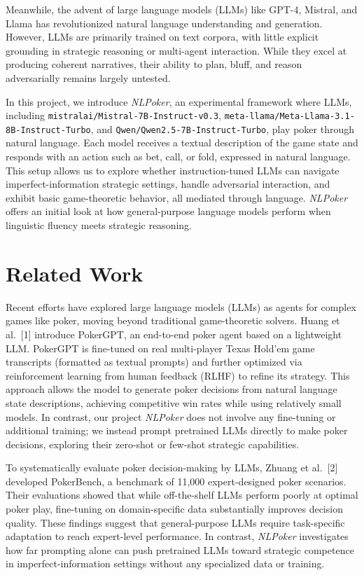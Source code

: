 \documentclass{article}
\begin{document}
Meanwhile, the advent of large language models (LLMs) like GPT-4, Mistral, and Llama has revolutionized natural language understanding and generation. However, LLMs are primarily trained on text corpora, with little explicit grounding in strategic reasoning or multi-agent interaction. While they excel at producing coherent narratives, their ability to plan, bluff, and reason adversarially remains largely untested.

In this project, we introduce \emph{NLPoker}, an experimental framework where LLMs, including \texttt{mistralai/Mistral-7B-Instruct-v0.3}, \texttt{meta-llama/Meta-Llama-3.1-8B-Instruct-Turbo}, and \texttt{Qwen/Qwen2.5-7B-Instruct-Turbo}, play poker through natural language. Each model receives a textual description of the game state and responds with an action such as bet, call, or fold, expressed in natural language. This setup allows us to explore whether instruction-tuned LLMs can navigate imperfect-information strategic settings, handle adversarial interaction, and exhibit basic game-theoretic behavior, all mediated through language. \emph{NLPoker} offers an initial look at how general-purpose language models perform when linguistic fluency meets strategic reasoning.

\section{Related Work}

Recent efforts have explored large language models (LLMs) as agents for complex games like poker, moving beyond traditional game-theoretic solvers. Huang et al.\ [1] introduce PokerGPT, an end-to-end poker agent based on a lightweight LLM. PokerGPT is fine-tuned on real multi-player Texas Hold’em game transcripts (formatted as textual prompts) and further optimized via reinforcement learning from human feedback (RLHF) to refine its strategy. This approach allows the model to generate poker decisions from natural language state descriptions, achieving competitive win rates while using relatively small models. In contrast, our project \emph{NLPoker} does not involve any fine-tuning or additional training; we instead prompt pretrained LLMs directly to make poker decisions, exploring their zero-shot or few-shot strategic capabilities.

To systematically evaluate poker decision-making by LLMs, Zhuang et al.\ [2] developed PokerBench, a benchmark of 11,000 expert-designed poker scenarios. Their evaluations showed that while off-the-shelf LLMs perform poorly at optimal poker play, fine-tuning on domain-specific data substantially improves decision quality. These findings suggest that general-purpose LLMs require task-specific adaptation to reach expert-level performance. In contrast, \emph{NLPoker} investigates how far prompting alone can push pretrained LLMs toward strategic competence in imperfect-information settings without any specialized data or training.
\end{document}
